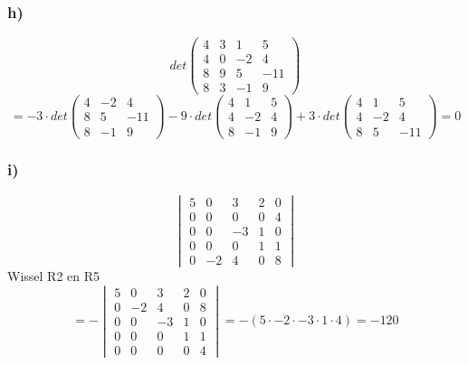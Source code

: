 \documentclass[lineaire_algebra_oplossingen.tex]{subfiles}
\begin{document}
\subsubsection*{h)}
\[ det
\begin{pmatrix}
4 & 3 & 1 & 5\\
4 & 0 & -2 & 4\\
8 & 9 & 5 & -11\\
8 & 3 & -1 & 9
\end{pmatrix}
\]
\[ = -3 \cdot det
\begin{pmatrix}
4 & -2 & 4\\
8 & 5 & -11\\
8 & -1 & 9
\end{pmatrix}
-9 \cdot det 
\begin{pmatrix}
4 & 1 & 5\\
4 & -2 & 4\\
8 & -1 & 9
\end{pmatrix}
+3 \cdot det
\begin{pmatrix}
4 & 1 & 5\\
4 & -2 & 4\\
8 & 5 & -11
\end{pmatrix}
= 0
\]

\subsubsection*{i)}
\[
\begin{vmatrix}
5 & 0 & 3 & 2 & 0\\
0 & 0 & 0 & 0 & 4\\
0 & 0 & -3  & 1 & 0\\
0 & 0 & 0 & 1 & 1\\
0 & -2 & 4 &0  &8
\end{vmatrix}
\]
Wissel R2 en R5
\[
=-
\begin{vmatrix}
5 & 0 & 3 & 2 & 0\\
0 & -2 & 4 &0  &8\\
0 & 0 & -3  & 1 & 0\\
0 & 0 & 0 & 1 & 1\\
0 & 0 & 0 & 0 & 4
\end{vmatrix}
= - (5 \cdot -2 \cdot -3 \cdot 1 \cdot 4) = -120
\]
\end{document}
